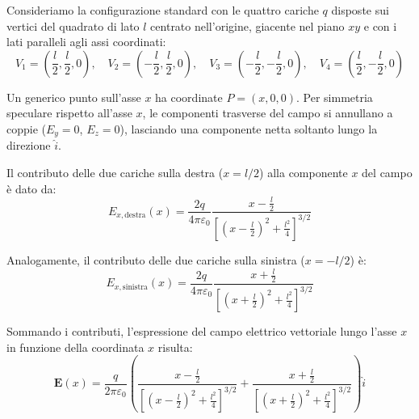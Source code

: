 \documentclass{article}
\begin{document}
Consideriamo la configurazione standard con le quattro cariche $q$ disposte sui vertici del quadrato di lato $l$ centrato nell'origine, giacente nel piano $xy$ e con i lati paralleli agli assi coordinati:
\begin{equation*}
V_1 = \left(\frac{l}{2}, \frac{l}{2}, 0\right), \quad 
V_2 = \left(-\frac{l}{2}, \frac{l}{2}, 0\right), \quad 
V_3 = \left(-\frac{l}{2}, -\frac{l}{2}, 0\right), \quad 
V_4 = \left(\frac{l}{2}, -\frac{l}{2}, 0\right)
\end{equation*}

Un generico punto sull'asse $x$ ha coordinate $P = (x, 0, 0)$. Per simmetria speculare rispetto all'asse $x$, le componenti trasverse del campo si annullano a coppie ($E_y = 0$, $E_z = 0$), lasciando una componente netta soltanto lungo la direzione $\hat{i}$.

Il contributo delle due cariche sulla destra ($x = l/2$) alla componente $x$ del campo è dato da:
\begin{equation*}
E_{x,\text{destra}}(x) = \frac{2q}{4\pi\varepsilon_0} \frac{x - \frac{l}{2}}{\left[\left(x - \frac{l}{2}\right)^2 + \frac{l^2}{4}\right]^{3/2}}
\end{equation*}

Analogamente, il contributo delle due cariche sulla sinistra ($x = -l/2$) è:
\begin{equation*}
E_{x,\text{sinistra}}(x) = \frac{2q}{4\pi\varepsilon_0} \frac{x + \frac{l}{2}}{\left[\left(x + \frac{l}{2}\right)^2 + \frac{l^2}{4}\right]^{3/2}}
\end{equation*}

Sommando i contributi, l'espressione del campo elettrico vettoriale lungo l'asse $x$ in funzione della coordinata $x$ risulta:
\begin{equation*}
\mathbf{E}(x) = \frac{q}{2\pi\varepsilon_0} \left( \frac{x - \frac{l}{2}}{\left[\left(x - \frac{l}{2}\right)^2 + \frac{l^2}{4}\right]^{3/2}} + \frac{x + \frac{l}{2}}{\left[\left(x + \frac{l}{2}\right)^2 + \frac{l^2}{4}\right]^{3/2}} \right) \hat{i}
\end{equation*}
\end{document}

